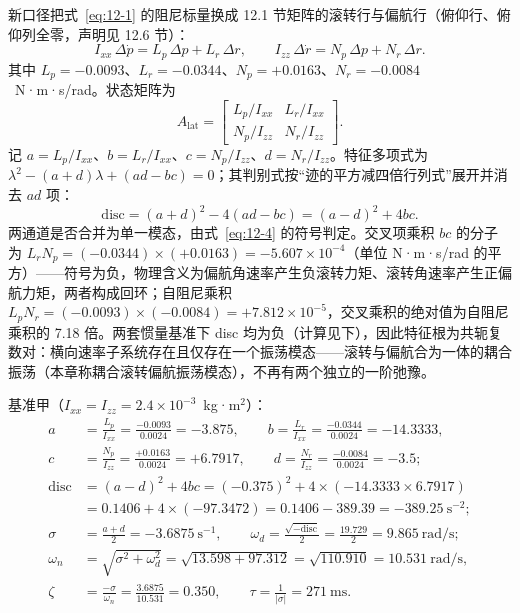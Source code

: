 \documentclass[11pt,a4paper]{ctexart}
\newcommand{\ud}[1]{\dot{#1}}
\begin{document}
新口径把式~\eqref{eq:12-1} 的阻尼标量换成 12.1 节矩阵的滚转行与偏航行（俯仰行、俯仰列全零，声明见 12.6 节）：
\begin{equation}\label{eq:12-2}
I_{xx}\,\Delta\ud{p}=L_p\,\Delta p+L_r\,\Delta r,\qquad
I_{zz}\,\Delta\ud{r}=N_p\,\Delta p+N_r\,\Delta r .
\end{equation}
其中 $L_p=-0.0093$、$L_r=-0.0344$、$N_p=+0.0163$、$N_r=-0.0084$~N·m·s/rad。状态矩阵为
\begin{equation}\label{eq:12-3}
A_{\mathrm{lat}}
=\begin{bmatrix}
L_p/I_{xx} & L_r/I_{xx}\\[2pt]
N_p/I_{zz} & N_r/I_{zz}
\end{bmatrix}.
\end{equation}
记 $a=L_p/I_{xx}$、$b=L_r/I_{xx}$、$c=N_p/I_{zz}$、$d=N_r/I_{zz}$。特征多项式为 $\lambda^2-(a+d)\lambda+(ad-bc)=0$；其判别式按“迹的平方减四倍行列式”展开并消去 $ad$ 项：
\begin{equation}\label{eq:12-4}
\mathrm{disc}=(a+d)^2-4(ad-bc)=(a-d)^2+4bc .
\end{equation}
两通道是否合并为单一模态，由式~\eqref{eq:12-4} 的符号判定。交叉项乘积 $bc$ 的分子为 $L_r N_p=(-0.0344)\times(+0.0163)=-5.607\times10^{-4}$（单位 N·m·s/rad 的平方）——符号为负，物理含义为偏航角速率产生负滚转力矩、滚转角速率产生正偏航力矩，两者构成回环；自阻尼乘积 $L_p N_r=(-0.0093)\times(-0.0084)=+7.812\times10^{-5}$，交叉乘积的绝对值为自阻尼乘积的 7.18 倍。两套惯量基准下 disc 均为负（计算见下），因此特征根为共轭复数对：横向速率子系统存在且仅存在一个振荡模态——滚转与偏航合为一体的耦合振荡（本章称耦合滚转偏航振荡模态），不再有两个独立的一阶弛豫。

基准甲（$I_{xx}=I_{zz}=2.4\times10^{-3}$~kg·m$^2$）：
\begin{align*}
a&=\frac{L_p}{I_{xx}}=\frac{-0.0093}{0.0024}=-3.875,\qquad
b=\frac{L_r}{I_{xx}}=\frac{-0.0344}{0.0024}=-14.3333,\\
c&=\frac{N_p}{I_{zz}}=\frac{+0.0163}{0.0024}=+6.7917,\qquad
d=\frac{N_r}{I_{zz}}=\frac{-0.0084}{0.0024}=-3.5;\\
\mathrm{disc}&=(a-d)^2+4bc=(-0.375)^2+4\times(-14.3333\times 6.7917)\\
&=0.1406+4\times(-97.3472)=0.1406-389.39=-389.25~\mathrm{s}^{-2};\\
\sigma&=\frac{a+d}{2}=-3.6875~\mathrm{s}^{-1},\qquad
\omega_d=\frac{\sqrt{-\mathrm{disc}}}{2}=\frac{19.729}{2}=9.865~\mathrm{rad/s};\\
\omega_n&=\sqrt{\sigma^2+\omega_d^2}=\sqrt{13.598+97.312}=\sqrt{110.910}=10.531~\mathrm{rad/s},\\
\zeta&=\frac{-\sigma}{\omega_n}=\frac{3.6875}{10.531}=0.350,\qquad
\tau=\frac{1}{|\sigma|}=271~\mathrm{ms}.
\end{align*}
\end{document}
